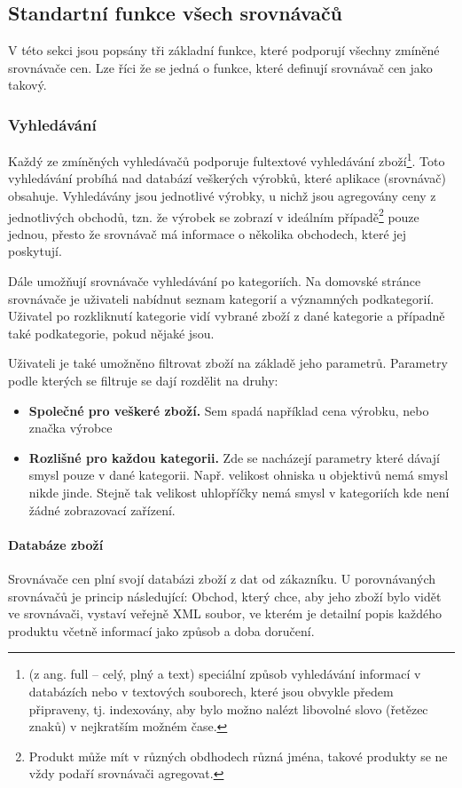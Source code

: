 \subsection{Standartní funkce všech srovnávačů}
V této sekci jsou popsány tři základní funkce, které podporují všechny zmíněné srovnávače cen. Lze říci že se jedná o funkce, které definují srovnávač cen jako takový.

\subsubsection{Vyhledávání}
Každý ze zmíněných vyhledávačů podporuje fultextové vyhledávání zboží\footnote{(z ang. full – celý, plný a text) speciální způsob vyhledávání informací v databázích nebo v textových souborech, které jsou obvykle předem připraveny, tj. indexovány, aby bylo možno nalézt libovolné slovo (řetězec znaků) v nejkratším možném čase.}. Toto vyhledávání probíhá nad databází veškerých výrobků, které aplikace (srovnávač) obsahuje. Vyhledávány jsou jednotlivé výrobky, u nichž jsou agregovány ceny z jednotlivých obchodů, tzn. že výrobek se zobrazí v ideálním případě\footnote{Produkt může mít v různých obdhodech různá jména, takové produkty se ne vždy podaří srovnávači agregovat.} pouze jednou, přesto že srovnávač má informace o několika obchodech, které jej poskytují.

Dále umožňují srovnávače vyhledávání po kategoriích. Na domovské stránce srovnávače je uživateli nabídnut seznam kategorií a významných podkategorií. Uživatel po rozkliknutí kategorie vidí vybrané zboží z dané kategorie a případně také podkategorie, pokud nějaké jsou.

Uživateli je také umožněno filtrovat zboží na základě jeho parametrů. Parametry podle kterých se filtruje se dají rozdělit na druhy:
\begin{itemize}
\item \textbf{Společné pro veškeré zboží.} Sem spadá například cena výrobku, nebo značka výrobce
\item \textbf{Rozlišné pro každou kategorii.} Zde se nacházejí parametry které dávají smysl pouze v dané kategorii. Např. velikost ohniska u objektivů nemá smysl nikde jinde. Stejně tak velikost uhlopříčky nemá smysl v kategoriích kde není žádné zobrazovací zařízení.
\end{itemize}

\paragraph{Databáze zboží}
Srovnávače cen plní svojí databázi zboží z dat od zákazníku. U porovnávaných srovnávačů je princip následující: Obchod, který chce, aby jeho zboží bylo vidět ve srovnávači, vystaví veřejně XML soubor, ve kterém je detailní popis každého produktu včetně informací jako způsob a doba doručení.\cite{website:heureka:registrace-obchodu}

